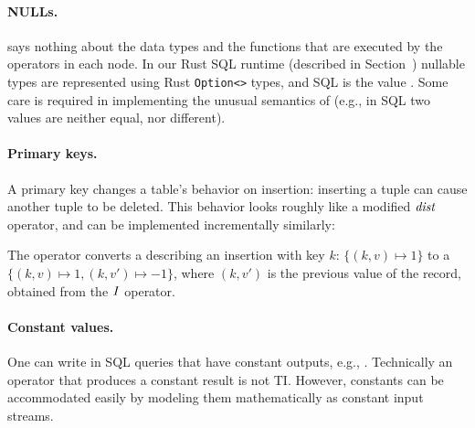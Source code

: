 \paragraph{NULLs.} \dbsp says nothing about the data types
and the functions that are executed by the operators in each node.  In
our Rust SQL runtime (described in Section~)
nullable types are represented using Rust \texttt{Option<>} types, and
SQL  is the value .  Some care is required in
implementing the unusual semantics of  (e.g., in SQL two
 values are neither equal, nor different).

\paragraph{Primary keys.} A primary key changes a table's behavior on insertion:
inserting a tuple can cause another tuple to be deleted.  This
behavior looks roughly like a modified $\mathit{dist}$ operator, and can
be implemented incrementally similarly:

\begin{center}
\end{center}

\noindent The  operator converts a \zr describing an
insertion with key $k$: $\{ (k, v) \mapsto 1 \}$ to a \zr $\{ (k, v)
\mapsto 1, (k, v') \mapsto -1 \}$, where $(k, v')$ is the previous
value of the record, obtained from the $\mathit{I}$ operator.

\paragraph{Constant values.}  One can write in SQL queries that have
constant outputs, e.g., .  Technically an operator that
produces a constant result is not TI.  However, constants can be
accommodated easily by modeling them mathematically as constant input
streams.


